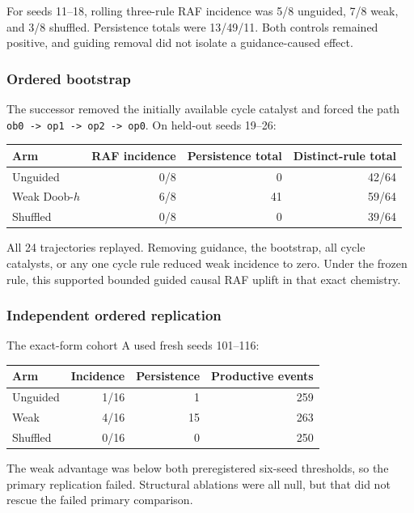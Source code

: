 \documentclass[11pt]{article}
\newcommand{\code}[1]{\texttt{#1}}
\begin{document}
For seeds 11--18, rolling three-rule RAF incidence was 5/8 unguided, 7/8 weak,
and 3/8 shuffled.  Persistence totals were 13/49/11.  Both controls remained
positive, and guiding removal did not isolate a guidance-caused effect.

\subsubsection{Ordered bootstrap}

The successor removed the initially available cycle catalyst and forced the
path \code{ob0 -> op1 -> op2 -> op0}.  On held-out seeds 19--26:

\begin{center}
\begin{tabular}{lrrr}
\toprule
Arm & RAF incidence & Persistence total & Distinct-rule total \\
\midrule
Unguided & 0/8 & 0 & 42/64 \\
Weak Doob-$h$ & 6/8 & 41 & 59/64 \\
Shuffled & 0/8 & 0 & 39/64 \\
\bottomrule
\end{tabular}
\end{center}

All 24 trajectories replayed.  Removing guidance, the bootstrap, all cycle
catalysts, or any one cycle rule reduced weak incidence to zero.  Under the
frozen rule, this supported bounded guided causal RAF uplift in that exact
chemistry.

\subsubsection{Independent ordered replication}

The exact-form cohort A used fresh seeds 101--116:

\begin{center}
\begin{tabular}{lrrr}
\toprule
Arm & Incidence & Persistence & Productive events \\
\midrule
Unguided & 1/16 & 1 & 259 \\
Weak & 4/16 & 15 & 263 \\
Shuffled & 0/16 & 0 & 250 \\
\bottomrule
\end{tabular}
\end{center}

The weak advantage was below both preregistered six-seed thresholds, so the
primary replication failed.  Structural ablations were all null, but that did
not rescue the failed primary comparison.
\end{document}
